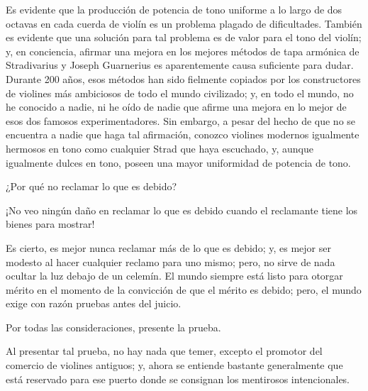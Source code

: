 \documentclass[12pt]{book}
\begin{document}
Es evidente que la producción de potencia de tono uniforme a lo largo de dos octavas en cada cuerda de violín es un problema plagado de dificultades. También es evidente que una solución para tal problema es de valor para el tono del violín; y, en conciencia, afirmar una mejora en los mejores métodos de tapa armónica de Stradivarius y Joseph Guarnerius es aparentemente causa suficiente para dudar. Durante 200 años, esos métodos han sido fielmente copiados por los constructores de violines más ambiciosos de todo el mundo civilizado; y, en todo el mundo, no he conocido a nadie, ni he oído de nadie que afirme una mejora en lo mejor de esos dos famosos experimentadores. Sin embargo, a pesar del hecho de que no se encuentra a nadie que haga tal afirmación, conozco violines modernos igualmente hermosos en tono como cualquier Strad que haya escuchado, y, aunque igualmente dulces en tono, poseen una mayor uniformidad de potencia de tono.

¿Por qué no reclamar lo que es debido?

¡No veo ningún daño en reclamar lo que es debido cuando el reclamante tiene los bienes para mostrar!

Es cierto, es mejor nunca reclamar más de lo que es debido; y, es mejor ser modesto al hacer cualquier reclamo para uno mismo; pero, no sirve de nada ocultar la luz debajo de un celemín. El mundo siempre está listo para otorgar mérito en el momento de la convicción de que el mérito es debido; pero, el mundo exige con razón pruebas antes del juicio.

Por todas las consideraciones, presente la prueba.

Al presentar tal prueba, no hay nada que temer, excepto el promotor del comercio de violines antiguos; y, ahora se entiende bastante generalmente que está reservado para ese puerto donde se consignan los mentirosos intencionales.
\end{document}

